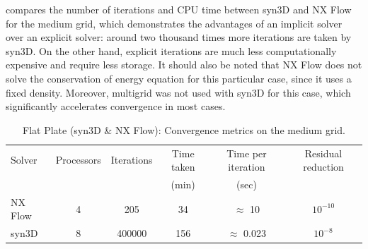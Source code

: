  compares the number of iterations and CPU time between syn3D and NX Flow for the medium grid, which demonstrates the advantages of an implicit solver over an explicit solver: around two thousand times more iterations are taken by syn3D. On the other hand, explicit iterations are much less computationally expensive and require less storage. It should also be noted that NX Flow does not solve the conservation of energy equation for this particular case, since it uses a fixed density. Moreover, multigrid was not used with syn3D for this case, which significantly accelerates convergence in most cases.
\begin{table}
\caption{Flat Plate (syn3D \& NX Flow): Convergence metrics on the medium grid.}
\label{tab:flatcpu}
\begin{tabular}{@{}l ccccc@{}}
\toprule
Solver & Processors & Iterations & Time taken & Time per iteration & Residual reduction \\
       &            &            & (min)      & (sec)              &                    \\
\midrule
NX Flow & 4 & 205 & 34 & $\approx$ 10 & $10^{-10}$ \\
syn3D & 8 & 400000 & 156 & $\approx$ 0.023 & $10^{-8}$
\\
\bottomrule
\end{tabular}
\end{table}

